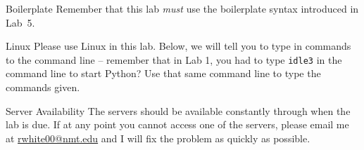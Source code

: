 \documentclass[11pt]{cselabheader}
\begin{document}
\begin{warningbox}{Boilerplate}
  Remember that this lab \emph{must} use the
  boilerplate syntax introduced in Lab~5.
\end{warningbox}

\begin{warningbox}{Linux}
  Please use Linux in this lab. Below, we will tell you to type in commands to
  the command line -- remember that in Lab 1, you had to type \texttt{idle3} in
  the command line to start Python? Use that same command line to type the
  commands given.
\end{warningbox}

\begin{warningbox}{Server Availability}
  The servers should be available constantly through when the lab is due. If at
  any point you cannot access one of the servers, please email me at
  \href{mailto:rwhite00@nmt.edu}{rwhite00@nmt.edu} and I will fix the problem
  as quickly as possible.
\end{warningbox}
\end{document}
